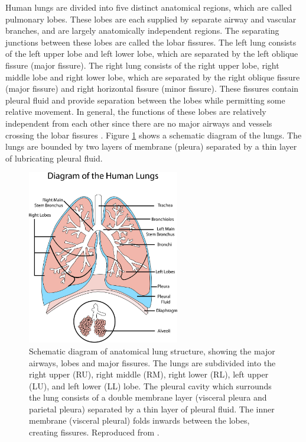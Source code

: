 Human lungs are divided into five distinct anatomical regions, which are called pulmonary lobes. These lobes are each supplied by separate airway and vascular branches, and are largely anatomically independent regions. The separating junctions between these lobes are called the lobar fissures. The left lung consists of the left upper lobe and left lower lobe, which are separated by the left oblique fissure (major fissure). The right lung consists of the right upper lobe, right middle lobe and right lower lobe, which are separated by the right oblique fissure (major fissure) and right horizontal fissure (minor fissure). These fissures contain pleural fluid and provide separation between the lobes while permitting some relative movement. In general, the functions of these lobes are relatively independent from each other since there are no major airways and vessels crossing the lobar fissures \citep{lassen2010automatic,doel2015review,ukil2009anatomy}. Figure \ref{fig:LobeAnatomicalStructure} shows a schematic diagram of the lungs. The lungs are bounded by two layers of membrane (pleura) separated by a thin layer of lubricating pleural fluid. 

\begin{figure}[h!]
  \centering 
  \includegraphics[height=3.0in]{Segmentation/Image/LobeAnatomicalStructure.jpg}
  \caption{Schematic diagram of anatomical lung structure, showing the major airways, lobes and major fissures. The lungs are subdivided into the right upper (RU), right middle (RM), right lower (RL), left upper (LU), and left lower (LL) lobe. The pleural cavity which surrounds the lung consists of a double membrane layer (visceral pleura and parietal pleura) separated by a thin layer of pleural fluid. The inner membrane (visceral pleural) folds inwards between the lobes, creating fissures. Reproduced from \citep{doel2015review}.}
  \label{fig:LobeAnatomicalStructure}
\end{figure}

